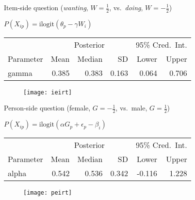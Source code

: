 \documentclass[aspectratio=169]{beamer}
\begin{document}
\begin{frame}[fragile]{Item-side question (\textit{wanting}, $W=\frac{1}{2}$, vs.\ \textit{doing}, $W=-\frac{1}{2}$)}\centering

$P\left(X_{ip}\right) = \text{ilogit}\left(\theta_p - \gamma W_i\right)$

\begin{table}[h]
	\scriptsize
	\label{tab:mCMCSummary}
	{
		\begin{tabular}{lrrrrr}
			\toprule
			\multicolumn{1}{c}{} & \multicolumn{3}{c}{Posterior} & \multicolumn{2}{c}{95\% Cred.\ Int.}\\
			\cline{2-4}\cline{5-6}
			Parameter & Mean & Median & SD & Lower & Upper  \\
			\cmidrule[0.4pt]{1-6}
			gamma & 0.385 & 0.383 & 0.163 & 0.064 & 0.706   \\
			\bottomrule
		\end{tabular}
	}
\end{table}

\begin{figure}[htp]
\texttt{[image: ieirt]}
\end{figure}

\end{frame}


\begin{frame}[fragile]{Person-side question (female, $G=-\frac{1}{2}$, vs.\ male, $G=\frac{1}{2}$)}\centering

$P\left(X_{ip}\right) = \text{ilogit}\left(\alpha G_p + \epsilon_p - \beta_i \right)$

\begin{table}[h]
	\scriptsize
	\label{tab:mCMCSummary}
	{
		\begin{tabular}{lrrrrr}
			\toprule
			\multicolumn{1}{c}{} & \multicolumn{3}{c}{Posterior} & \multicolumn{2}{c}{95\% Cred.\ Int.} \\
			\cline{2-4}\cline{5-6}
			Parameter & Mean & Median & SD & Lower & Upper   \\
			\cmidrule[0.4pt]{1-6}
			alpha & 0.542 & 0.536 & 0.342 & -0.116 & 1.228  \\
			\bottomrule
		\end{tabular}
	}
\end{table}

\begin{figure}[htp]
\texttt{[image: peirt]}
\end{figure}

\end{frame}
\end{document}
